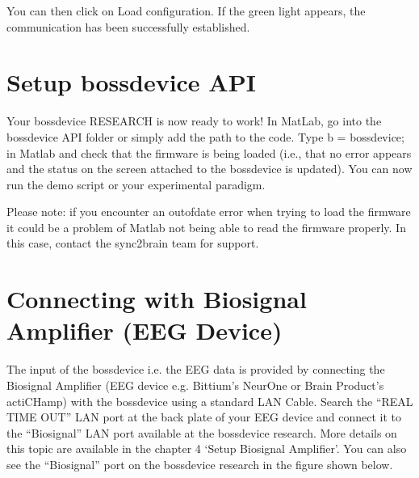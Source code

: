 \documentclass[letterpaper,10pt,english]{sphinxmanual}
\begin{document}
\begin{sphinxVerbatim}[commandchars=\\\{\}]
           
          
      
\end{sphinxVerbatim}

\sphinxAtStartPar
You can then click on Load configuration. If the green light appears, the communication has been successfully established.


\section{Setup bossdevice API}
\label{\detokenize{2_setup_bossdevice_research:setup-bossdevice-api}}
\sphinxAtStartPar
Your bossdevice RESEARCH is now ready to work! In MatLab, go into the bossdevice API folder or simply add the path to the code. Type b = bossdevice; in Matlab and check that the firmware is being loaded (i.e., that no error appears and the status on the screen attached to the bossdevice is updated). You can now run the demo script or your experimental paradigm.

\sphinxAtStartPar
Please note: if you encounter an out\sphinxhyphen{}of\sphinxhyphen{}date error when trying to load the firmware it could be a problem of Matlab not being able to read the firmware properly. In this case, contact the sync2brain team for support.


\section{Connecting with Biosignal Amplifier (EEG Device)}
\label{\detokenize{2_setup_bossdevice_research:connecting-with-biosignal-amplifier-eeg-device}}
\sphinxAtStartPar
The input of the bossdevice i.e. the EEG data is provided by connecting the Biosignal Amplifier (EEG device e.g. Bittium’s NeurOne or Brain Product’s actiCHamp) with the bossdevice using a standard LAN Cable. Search the “REAL TIME OUT” LAN port at the back plate of your EEG device and connect it to the “Biosignal” LAN port available at the bossdevice research. More details on this topic are available in the chapter 4 ‘Setup Biosignal Amplifier’. You can also see the “Biosignal” port on the bossdevice research in the figure shown below.
\end{document}
